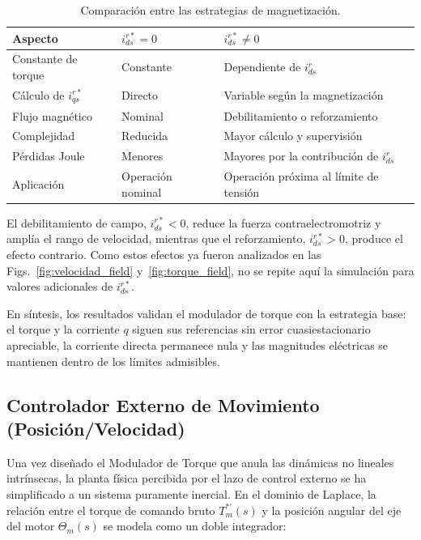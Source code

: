\documentclass[10pt,a4paper]{article}
\begin{document}
\begin{table}[H]
	\centering
	\caption{Comparación entre las estrategias de magnetización.}
	\label{tab:comparacion_estrategias_modulador}
	\begin{tabular}{p{}
			p{}
			p{}}
		\toprule
		Aspecto &
		$i_{ds}^{r*}=0$ &
		$i_{ds}^{r*}\neq0$ \\
		\midrule
		Constante de torque &
		Constante &
		Dependiente de $i_{ds}^{r}$ \\
		
		Cálculo de $i_{qs}^{r*}$ &
		Directo &
		Variable según la magnetización \\
		
		Flujo magnético &
		Nominal &
		Debilitamiento o reforzamiento \\
		
		Complejidad &
		Reducida &
		Mayor cálculo y supervisión \\
		
		Pérdidas Joule &
		Menores &
		Mayores por la contribución de $i_{ds}^{r}$ \\
		
		Aplicación &
		Operación nominal &
		Operación próxima al límite de tensión \\
		\bottomrule
	\end{tabular}
\end{table}

El debilitamiento de campo, $i_{ds}^{r*}<0$, reduce la fuerza
contraelectromotriz y amplía el rango de velocidad, mientras que el
reforzamiento, $i_{ds}^{r*}>0$, produce el efecto contrario. Como estos efectos
ya fueron analizados en las Figs.~\ref{fig:velocidad_field}
y~\ref{fig:torque_field}, no se repite aquí la simulación para valores
adicionales de $i_{ds}^{r*}$.

En síntesis, los resultados validan el modulador de torque con la estrategia
base: el torque y la corriente $q$ siguen sus referencias sin error
cuasiestacionario apreciable, la corriente directa permanece nula y las
magnitudes eléctricas se mantienen dentro de los límites admisibles.

\FloatBarrier

\subsection{Controlador Externo de Movimiento (Posición/Velocidad)}

Una vez diseñado el Modulador de Torque que anula las dinámicas no lineales intrínsecas, la planta física percibida por el lazo de control externo se ha simplificado a un sistema puramente inercial. En el dominio de Laplace, la relación entre el torque de comando bruto $T_m^{*\prime}(s)$ y la posición angular del eje del motor $\Theta_m(s)$ se modela como un doble integrador:
\end{document}
